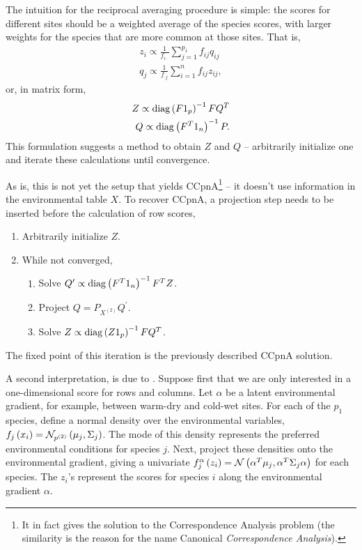 \documentclass{article}
\begin{document}
The intuition for the reciprocal averaging procedure is simple: the
scores for different sites should be a weighted average of the species
scores, with larger weights for the species that are more common at
those sites. That is,
\begin{align*}
  z_{i} \propto \frac{1}{f_{i\cdot}}\sum_{j = 1}^{p_{1}}f_{ij}q_{ij} \\
  q_{j} \propto \frac{1}{f_{\cdot j}} \sum_{i = 1}^{n} f_{ij}z_{ij},
\end{align*}
or, in matrix form,
\begin{align*}
Z \propto \mathop\mathrm{diag}\left(F 1_{p}\right)^{-1} F Q^{T} \\
Q \propto \mathop\mathrm{diag}\left(F^{T} 1_{n}\right)^{-1} P.
\end{align*}
This formulation suggests a method to obtain $Z$ and $Q$ -- arbitrarily
initialize one and iterate these calculations until convergence.

As is, this is not yet the setup that yields CCpnA\footnote{It in fact gives the
  solution to the Correspondence Analysis problem (the similarity is the reason
  for the name Canonical \textit{Correspondence Analysis}).} -- it doesn't use
information in the environmental table $X$. To recover CCpnA, a projection step
needs to be inserted before the calculation of row scores,
\begin{enumerate}
\item Arbitrarily initialize $Z$.
\item While not converged,
\begin{enumerate}
\item Solve $Q^{\prime} \propto \mathop\mathrm{diag}\left(F^{T}1_{n}\right)^{-1}F^{T}Z$.
\item Project $Q = P_{X^{(2)}}Q^{\prime}$.
\item Solve $Z \propto \mathop\mathrm{diag}\left(Z 1_{p}\right)^{-1} F Q^{T}$.
\end{enumerate}
\end{enumerate}

The fixed point of this iteration is the previously described CCpnA solution.

A second interpretation, is due to \citep{zhu2005constrained}. Suppose first
that we are only interested in a one-dimensional score for rows and columns. Let
$\alpha$ be a latent environmental gradient, for example, between warm-dry and
cold-wet sites. For each of the $p_{1}$ species, define a normal density over
the environmental variables, $f_{j}\left(x_{i}\right) =
\mathcal{N}_{p^{(2)}}\left(\mu_{j}, \Sigma_{j}\right)$. The mode of this density
represents the preferred environmental conditions for species $j$. Next, project
these densities onto the environmental gradient, giving a univariate
$f_{j}^{\alpha}\left(z_{i}\right) = \mathcal{N}\left(\alpha^{T}\mu_{j}, \alpha^{T}
\Sigma_{j}\alpha\right)$ for each species. The $z_{i}$'s represent the scores
for species $i$ along the environmental gradient $\alpha$.
\end{document}
